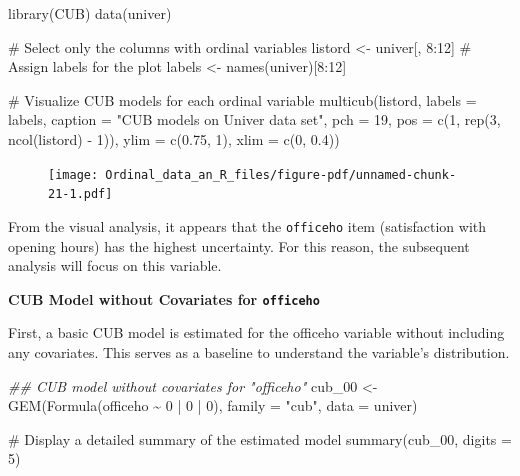 \documentclass[
  letterpaper,
  DIV=11,
  numbers=noendperiod]{scrartcl}
\newenvironment{Shaded}{\begin{snugshade}}{\end{snugshade}}
\newcommand{\AttributeTok}[1]{\textcolor[rgb]{0.40,0.45,0.13}{#1}}
\newcommand{\CommentTok}[1]{\textcolor[rgb]{0.37,0.37,0.37}{#1}}
\newcommand{\DecValTok}[1]{\textcolor[rgb]{0.68,0.00,0.00}{#1}}
\newcommand{\DocumentationTok}[1]{\textcolor[rgb]{0.37,0.37,0.37}{\textit{#1}}}
\newcommand{\FloatTok}[1]{\textcolor[rgb]{0.68,0.00,0.00}{#1}}
\newcommand{\FunctionTok}[1]{\textcolor[rgb]{0.28,0.35,0.67}{#1}}
\newcommand{\NormalTok}[1]{\textcolor[rgb]{0.00,0.23,0.31}{#1}}
\newcommand{\OtherTok}[1]{\textcolor[rgb]{0.00,0.23,0.31}{#1}}
\newcommand{\SpecialCharTok}[1]{\textcolor[rgb]{0.37,0.37,0.37}{#1}}
\newcommand{\StringTok}[1]{\textcolor[rgb]{0.13,0.47,0.30}{#1}}
\begin{document}
\begin{Shaded}
\begin{Highlighting}[]
\FunctionTok{library}\NormalTok{(CUB)}
\FunctionTok{data}\NormalTok{(univer)}

\CommentTok{\# Select only the columns with ordinal variables}
\NormalTok{listord }\OtherTok{\textless{}{-}}\NormalTok{ univer[, }\DecValTok{8}\SpecialCharTok{:}\DecValTok{12}\NormalTok{]}
\CommentTok{\# Assign labels for the plot}
\NormalTok{labels }\OtherTok{\textless{}{-}} \FunctionTok{names}\NormalTok{(univer)[}\DecValTok{8}\SpecialCharTok{:}\DecValTok{12}\NormalTok{]}

\CommentTok{\# Visualize CUB models for each ordinal variable}
\FunctionTok{multicub}\NormalTok{(listord, }\AttributeTok{labels =}\NormalTok{ labels,}
         \AttributeTok{caption =} \StringTok{"CUB models on Univer data set"}\NormalTok{, }\AttributeTok{pch =} \DecValTok{19}\NormalTok{,}
         \AttributeTok{pos =} \FunctionTok{c}\NormalTok{(}\DecValTok{1}\NormalTok{, }\FunctionTok{rep}\NormalTok{(}\DecValTok{3}\NormalTok{, }\FunctionTok{ncol}\NormalTok{(listord) }\SpecialCharTok{{-}} \DecValTok{1}\NormalTok{)), }\AttributeTok{ylim =} \FunctionTok{c}\NormalTok{(}\FloatTok{0.75}\NormalTok{, }\DecValTok{1}\NormalTok{), }\AttributeTok{xlim =} \FunctionTok{c}\NormalTok{(}\DecValTok{0}\NormalTok{, }\FloatTok{0.4}\NormalTok{))}
\end{Highlighting}
\end{Shaded}

\begin{figure}[H]

{\centering \texttt{[image: Ordinal\_data\_an\_R\_files/figure-pdf/unnamed-chunk-21-1.pdf]}

}

\end{figure}

From the visual analysis, it appears that the \texttt{officeho} item
(satisfaction with opening hours) has the highest uncertainty. For this
reason, the subsequent analysis will focus on this variable.

\textbf{CUB Model without Covariates for \texttt{officeho}}

First, a basic CUB model is estimated for the officeho variable without
including any covariates. This serves as a baseline to understand the
variable's distribution.

\begin{Shaded}
\begin{Highlighting}[]
\DocumentationTok{\#\# CUB model without covariates for "officeho"}
\NormalTok{cub\_00 }\OtherTok{\textless{}{-}} \FunctionTok{GEM}\NormalTok{(}\FunctionTok{Formula}\NormalTok{(officeho }\SpecialCharTok{\textasciitilde{}} \DecValTok{0} \SpecialCharTok{|} \DecValTok{0} \SpecialCharTok{|} \DecValTok{0}\NormalTok{), }\AttributeTok{family =} \StringTok{"cub"}\NormalTok{, }\AttributeTok{data =}\NormalTok{ univer)}

\CommentTok{\# Display a detailed summary of the estimated model}
\FunctionTok{summary}\NormalTok{(cub\_00, }\AttributeTok{digits =} \DecValTok{5}\NormalTok{)}
\end{Highlighting}
\end{Shaded}
\end{document}
